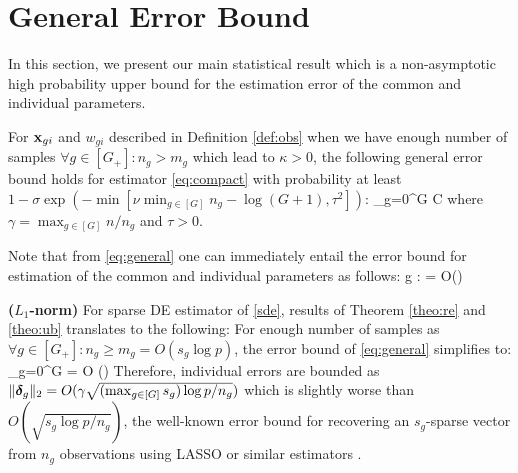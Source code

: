 \section{General Error Bound}
\label{sec:error}
In this section, we present our main statistical result which is a non-asymptotic high probability upper bound for the estimation error of the common and individual parameters.
\begin{theorem}
	\label{theo:calcub}
	For $\mathbf{x}_{gi}$ and $w_{gi}$ described in Definition \ref{def:obs} when we have enough number of samples $\forall g \in [G_+]: n_g > m_g$ which lead to $\kappa > 0$, the following general error bound holds for estimator \eqref{eq:compact} with probability at least $1 - \sigma \exp\left(-\min\left[\nu  \min_{g \in [G]} n_g - \log (G+1), \tau^2\right]\right) $: 
	\be
	\label{eq:general}
	\sum_{g=0}^{G}  
	\leq C {\gamma} 
	\ee
	where $\gamma = \max_{g \in [G]} n/n_g$  and $\tau > 0$.
\end{theorem}

\begin{corollary}
	\label{corr:single}
	Note that from \eqref{eq:general} one can immediately entail the error bound for estimation of the common and individual parameters as follows:
	\be
	\nr
	\forall g \in [G_+]: \quad {} =  O\left(\gamma {}\right)
	\ee
\end{corollary}

\begin{example}
	{\bf ($L_1$-norm)} For sparse DE estimator of \eqref{sde}, results of Theorem \ref{theo:re} and \ref{theo:ub} translates to the following: For enough number of samples as $\forall g \in [G_+]: n_g \geq m_g = O(s_g \log p)$, the error bound of \eqref{eq:general} simplifies to:
	\be
	\sum_{g=0}^{G}  	= O \left(\gamma {}\right) 
	\ee 
	Therefore, individual errors are bounded as $\|\boldsymbol{\delta}_g\|_{2}	= O (\gamma \sqrt{(\max_{g \in [G]}  s_g)\log p/n_g})$
	which is slightly worse than $O(\sqrt{s_g\log p/n_g})$, the well-known error bound for recovering an $s_g$-sparse vector from $n_g$ observations using LASSO or similar estimators \cite{banerjee14, venkat12, candes2007dantzig, chatterjee2014generalized, bickel2009simultaneous}. 
\end{example}

